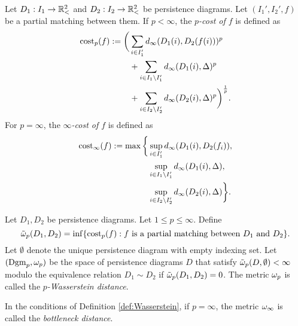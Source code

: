 \begin{definition}[$p$-cost] \label{def:pcost}
    Let $ D_1: I_1 \to \mathbb{R}_<^2 $ and $ D_2: I_2 \to \mathbb{R}_<^2 $ be persistence diagrams. Let $ (I_1', I_2', f) $ be a partial matching between them. If $ p < \infty $, the {\it $p$-cost of $ f $} is defined as
    \begin{align*}
        \operatorname{cost}_p(f) := \bigg(&\sum_{i \in I_1'} d_\infty(D_1(i), D_2(f(i)))^p \\
        &+ \sum_{i \in I_1 \setminus I_1'} d_\infty(D_1(i), \Delta)^p \\
        &+ \sum_{i \in I_2 \setminus I_2'} d_\infty(D_2(i), \Delta)^p \bigg)^{\frac{1}{p}}.
    \end{align*}
    For $ p = \infty $, the {\it $\infty$-cost of $ f $} is defined as
    \begin{align*}
        \operatorname{cost}_\infty(f) := \max \bigg\{&\sup_{i \in I_1'} d_\infty(D_1(i), D_2(f_i)), \\
        &\sup_{i\in I_1 \setminus I_1'} d_\infty(D_1(i), \Delta), \\
        &\sup_{i\in I_2 \setminus I_2'} d_\infty(D_2(i), \Delta)\bigg\}.
    \end{align*}
\end{definition}

\begin{definition} \label{def:Wasserstein}
    Let $ D_1, D_2 $ be persistence diagrams. Let $ 1 \leq p \leq \infty $. Define
    \begin{equation}
        \tilde \omega_p (D_1, D_2) = \inf \{\operatorname{cost}_p(f) : f \text{ is a partial matching between } D_1 \text{ and } D_2 \}.
    \end{equation}
    Let $ \emptyset $ denote the unique persistence diagram with empty indexing set. Let $ (\operatorname{Dgm}_p, \omega_p) $ be the space of persistence diagrams $ D $ that satisfy $ \tilde \omega_p(D, \emptyset) < \infty $ modulo the equivalence relation $ D_1 \sim D_2 $ if $ \tilde \omega_p (D_1, D_2) = 0 $. The metric $ \omega_p $ is called the {\it $p$-Wasserstein distance}.
\end{definition}

\begin{definition}
    In the conditions of Definition \ref{def:Wasserstein}, if $ p = \infty $, the metric $ \omega_\infty $ is called the {\it bottleneck distance}.
\end{definition}

